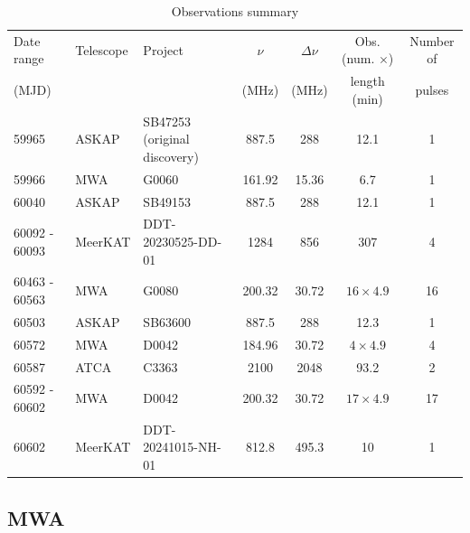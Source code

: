 \documentclass[fleqn,usenatbib]{mnras}
\begin{document}
\begin{table}
  \centering
  \caption{Observations summary}
  \label{tbl:obs}
  \begin{tabular}{lllcccc}
    \hline
    Date range & Telescope & Project & $\nu$ & $\Delta\nu$ & Obs. (num. $\times$) & Number of \\ 
    (MJD) & & & (MHz) & (MHz) & length (min) & pulses \\
    \hline 
    59965 & ASKAP & SB47253 (original discovery) & 887.5 & 288 & 12.1 & 1 \\
    59966 & MWA & G0060 & 161.92 & 15.36 & 6.7 & 1 \\
    60040  & ASKAP & SB49153 & 887.5 & 288 & 12.1 & 1 \\
    60092 - 60093 & MeerKAT & DDT-20230525-DD-01 & 1284 & 856 & 307 & 4 \\
    60463 - 60563 & MWA & G0080 & 200.32 & 30.72 & $16 \times 4.9$ & 16 \\
    60503 & ASKAP & SB63600 & 887.5 & 288 & 12.3 & 1 \\
    60572 & MWA & D0042 & 184.96 & 30.72 & $4 \times 4.9$ & 4 \\
    60587 & ATCA & C3363 & 2100 & 2048 & 93.2 & 2 \\
    60592 - 60602 & MWA & D0042 & 200.32 & 30.72 & $17 \times 4.9$ & 17 \\
    60602 & MeerKAT & DDT-20241015-NH-01 & 812.8 & 495.3 & 10 & 1 \\
    \hline
  \end{tabular}
\end{table}

\subsection{MWA} \label{sec:mwa}
\end{document}
